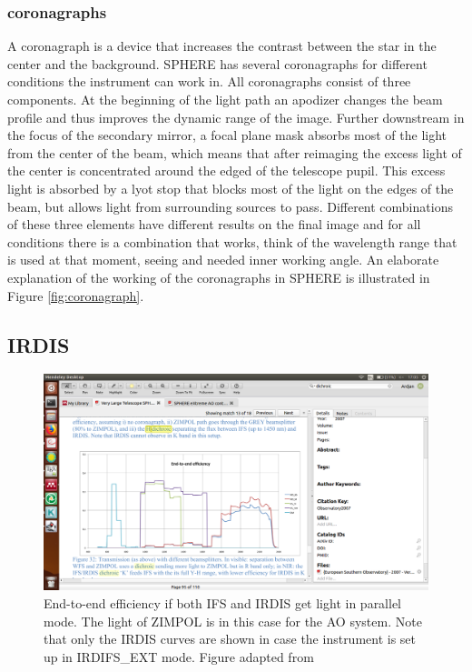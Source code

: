\documentclass[twoside,single,12pt]{lion-msc}
\begin{document}
\subsubsection{coronagraphs}
A coronagraph is a device that increases the contrast between the star in the center and the background. SPHERE has several coronagraphs for different conditions the instrument can work in. All coronagraphs consist of three components. At the beginning of the light path an apodizer changes the beam profile and thus improves the dynamic range of the image. Further downstream in the focus of the secondary mirror, a focal plane mask absorbs most of the light from the center of the beam, which means that after reimaging the excess light of the center is concentrated around the edged of the telescope pupil. This excess light is absorbed by a lyot stop that blocks most of the light on the edges of the beam, but allows light from surrounding sources to pass. Different combinations of these three elements have different results on the final image and for all conditions there is a combination that works, think of the wavelength range that is used at that moment, seeing and needed inner working angle. An elaborate explanation of the working of the coronagraphs in SPHERE is illustrated in Figure \ref{fig:coronagraph}.

\subsection{IRDIS}
\begin{figure}[!b]
\centering
\includegraphics[trim={4cm 4.3cm 16cm 9cm},clip,width = \textwidth]{systemthroughput}
\caption{End-to-end efficiency if both IFS and IRDIS get light in parallel mode. The light of ZIMPOL is in this case for the AO system. Note that only the IRDIS curves are shown in case the instrument is set up in IRDIFS\_EXT mode. Figure adapted from \cite{Observatory2007}}
\label{fig:systemthrougput}
\end{figure}
\end{document}
